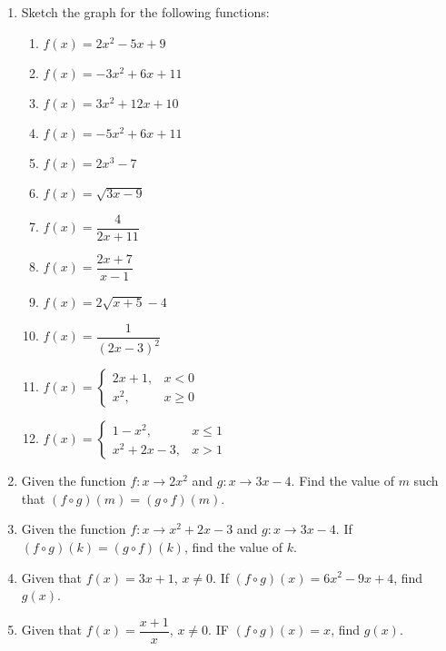 \documentclass[12pt]{report}
\begin{document}
\begin{multicols}{2}
\begin{enumerate}
    \item Sketch the graph for the following functions:
          \begin{enumerate}
            \item $f(x) = 2x^2 - 5x + 9$
            \item $f(x) = -3x^2 + 6x + 11$
            \item $f(x) = 3x^2 + 12x + 10$
            \item $f(x) = -5x^2 + 6x + 11$
            \item $f(x) = 2x^3 - 7$
            \item $f(x) = \sqrt{3x - 9}$
            \item $f(x) = \dfrac{4}{2x+11}$
            \item $f(x) = \dfrac{2x + 7}{x-1}$
            \item $f(x) = 2\sqrt{x+5} - 4$
            \item $f(x) = \dfrac{1}{(2x - 3)^2}$
            \item $f(x) = \left\{\begin{array}{rl}
                      2x + 1, & x < 0    \\
                      x^2,    & x \geq 0
                    \end{array}\right.$
            \item $f(x) = \left\{\begin{array}{rl}
                      1 - x^2,      & x \leq 1 \\
                      x^2 + 2x - 3, & x > 1
                    \end{array}\right.$
          \end{enumerate}

    \item Given the function $f:x \to 2x^2$ and $g:x \to 3x - 4$. Find the value of $m$
          such that $(f \circ g)(m) = (g \circ f)(m)$.

    \item Given the function $f:x \to x^2 + 2x - 3$ and $g:x \to 3x - 4$. If $(f \circ
            g)(k) = (g \circ f)(k)$, find the value of $k$.

    \item Given that $f(x) = 3x + 1$, $x \neq 0$. If $(f \circ g)(x) = 6x^2 - 9x + 4$,
          find $g(x)$.

    \item Given that $f(x) = \dfrac{x+1}{x}$, $x \neq 0$. IF $(f \circ g)(x) = x$, find
          $g(x)$.


\end{enumerate}
\end{multicols}
\end{document}
